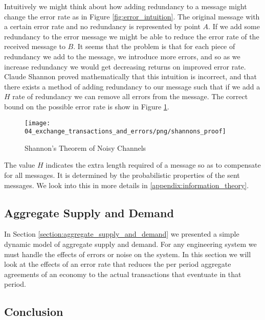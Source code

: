 Intuitively we might think about how adding redundancy to a message might change the error rate as
in Figure \ref{fig:error_intuition}. The original message with a certain error rate and no
redundancy is represented by point $A$. If we add some redundancy to the error message we might be
able to reduce the error rate of the received message to $B$. It seems that the problem is that for
each piece of redundancy we add to the message, we introduce more errors, and so as we increase
redundancy we would get decreasing returns on improved error rate. Claude Shannon proved
mathematically that this intuition is incorrect, and that there exists a method of adding redundancy
to our message such that if we add a $H$ rate of redundancy we can remove all errors from the
message. The correct bound on the possible error rate is show in Figure \ref{fig:shannons_proof}.

\begin{figure}[H]
\centering
\texttt{[image: 04\_exchange\_transactions\_and\_errors/png/shannons\_proof]}
\caption{Shannon's Theorem of Noisy Channels}
\label{fig:shannons_proof}
\end{figure}

The value $H$ indicates the extra length required of a message so as to compensate for all messages.
It is determined by the probabilistic properties of the sent messages. We look into this in more
details in \ref{appendix:information_theory}.

\subsection{Aggregate Supply and Demand}
\label{section:aggregate_supply_and_demand_with_noise}

In Section \ref{section:aggregate_supply_and_demand} we presented a simple dynamic model of aggregate supply and
demand. For any engineering system we must handle the effects of errors or noise on the system. In
this section we will look at the effects of an error rate that reduces the per period aggregate
agreements of an economy to the actual transactions that eventuate in that period.

 

\subsection{Conclusion}

